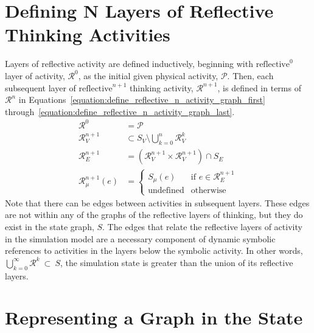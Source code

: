 \section{Defining N Layers of Reflective Thinking Activities}

Layers of reflective activity are defined inductively, beginning with
$\text{reflective}^0$ layer of activity, $\mathcal{R}^0$, as the
initial given physical activity, $\mathcal{P}$.  Then, each subsequent
layer of $\text{reflective}^{n+1}$ thinking activity,
$\mathcal{R}^{n+1}$, is defined in terms of $\mathcal{R}^n$ in
{\mbox{Equations~\ref{equation:define_reflective_n_activity_graph_first}}}
{\mbox{through~\ref{equation:define_reflective_n_activity_graph_last}}}.
\begin{align}
\label{equation:define_reflective_n_activity_graph_first}
                                        \mathcal{R}^0 &= \mathcal{P} \\
                                   \mathcal{R}^{n+1}_V &\subset S_V \setminus \bigcup_{k=0}^n\mathcal{R}^k_V \\
                                   \mathcal{R}^{n+1}_E &= (\mathcal{R}^{n+1}_V \times \mathcal{R}^{n+1}_V) \cap S_E \\
\label{equation:define_reflective_n_activity_graph_last}
                              \mathcal{R}^{n+1}_\mu(e) &= {\left\{
                                                            \begin{array}{ll}
                                                              S_\mu(e)          & \text{if }e {\in} \mathcal{R}^{n+1}_E \\
                                                              \text{undefined} & \text{otherwise}
                                                            \end{array}
                                                          \right.}
\end{align}
Note that there can be edges between activities in subsequent layers.
These edges are not within any of the graphs of the reflective layers
of thinking, but they do exist in the state graph, $S$.  The edges
that relate the reflective layers of activity in the simulation model
are a necessary component of dynamic symbolic references to activities
in the layers below the symbolic activity.  In other words,
$\bigcup_{k=0}^\infty\mathcal{R}^k\ \subset\ S$, the simulation state
is greater than the union of its reflective layers.

\section{Representing a Graph in the State}

